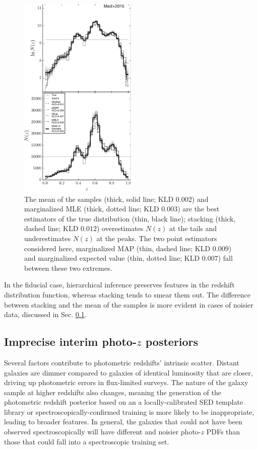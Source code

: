 \documentclass[preprint]{aastex}
\begin{document}
\begin{figure}
\includegraphics[width=0.5\textwidth]{figs/null/comps.pdf}
\caption{The mean of the samples (thick, solid line; KLD $0.002$) and 
marginalized MLE (thick, dotted line; KLD $0.003$) are the best estimators of 
the true distribution (thin, black line); stacking (thick, dashed line; KLD 
$0.012$) overestimates $N(z)$ at the tails and underestimates $N(z)$ at the 
peaks.  The two point estimators considered here, marginalized MAP (thin, 
dashed line; KLD $0.009$) and marginalized expected value (thin, dotted line; 
KLD $0.007$) fall between these two extremes.}
\label{fig:null-comp}
\end{figure}

In the fiducial case, hierarchical inference preserves features in the redshift 
distribution function, whereas stacking tends to smear them out.  The 
difference between stacking and the mean of the samples is more evident in 
cases of noisier data, discussed in Sec. \ref{sec:noisy}.

\subsection{Imprecise interim photo-$z$ posteriors}
\label{sec:noisy}

Several factors contribute to photometric redshifts' intrinsic scatter.  
Distant galaxies are dimmer compared to galaxies of identical luminosity that 
are closer, driving up photometric errors in flux-limited surveys.  The nature 
of the galaxy sample at higher redshifts also changes, meaning the generation 
of the photometric redshift posterior based on an a locally-calibrated SED 
template library or spectroscopically-confirmed training is more likely to be 
inappropriate, leading to broader features.  In general, the galaxies that 
could not have been observed spectroscopically will have different and noisier 
photo-$z$ PDFs than those that could fall into a spectroscopic training set.
\end{document}
